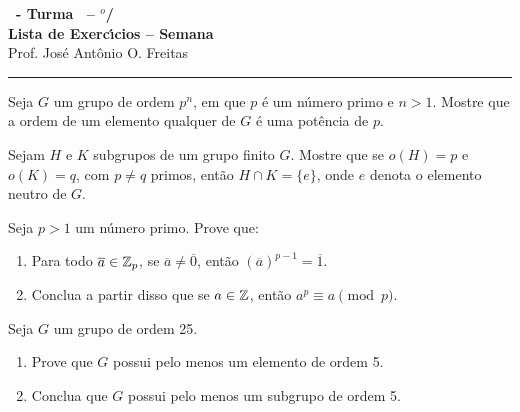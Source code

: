 \documentclass[12pt]{exam}
\begin{document}
\begin{center}

    {\Large\bf \disciplina\ - Turma \turma\ -- \semestre$^{o}$/\ano} \\ \vspace{9pt} {\large\bf
        Lista de Exerc{\'\i}cios -- Semana \numerosemana}\\ \vspace{9pt} Prof. Jos{\'e} Ant{\^o}nio O. Freitas
    \end{center}
    \hrule

    \vspace{.6cm}

    \questao{} Seja $G$ um grupo de ordem $p^n$, em que $p$ \'e um n\'umero primo e $n > 1$. Mostre que a ordem de um elemento qualquer de $G$ \'e uma pot\^encia de $p$.

    \vspace{.3cm}

    \questao{} Sejam $H$ e $K$ subgrupos de um grupo finito $G$. Mostre que se $o(H) = p$ e $o(K) = q$, com $p \ne q$ primos, ent\~ao $H \cap K = \{e\}$, onde $e$ denota o elemento neutro de $G$.

    \vspace{.3cm}

    \questao{} Seja $p > 1$ um n\'umero primo. Prove que:
    \begin{enumerate}[label=({\alph*})]
      \item Para todo $\overline{a} \in \mathbb{Z}_p$, se $\overline{a} \ne \overline{0}$, ent\~ao $(\overline{a})^{p-1} = \overline{1}$.

      \item Conclua a partir disso que se $a \in \mathbb{Z}$, ent\~ao $a^p \equiv a \pmod p$.
    \end{enumerate}

    \vspace{.3cm}

    \questao{} Seja $G$ um grupo de ordem 25.
    \begin{enumerate}[label=({\alph*})]
        \item Prove que $G$ possui pelo menos um elemento de ordem 5.

        \item Conclua que $G$ possui pelo menos um subgrupo de ordem 5.
    \end{enumerate}
\end{document}
